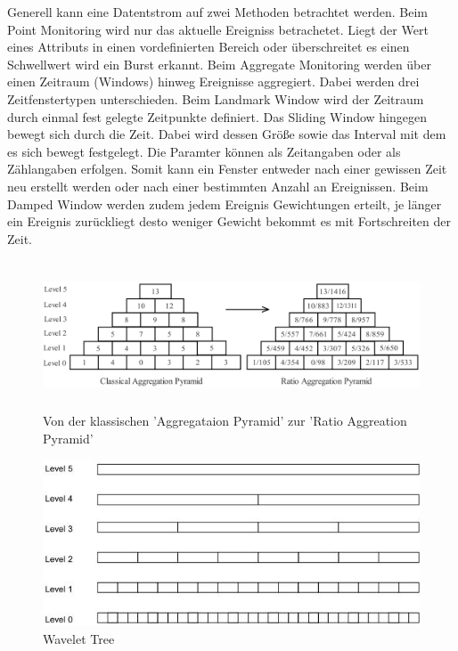 Generell kann eine Datentstrom auf zwei Methoden betrachtet werden. Beim Point Monitoring wird nur das aktuelle Ereigniss betrachetet. Liegt der Wert eines Attributs in einen vordefinierten Bereich oder überschreitet es einen Schwellwert wird ein Burst erkannt. Beim Aggregate Monitoring werden über einen Zeitraum (Windows) hinweg Ereignisse aggregiert. Dabei werden drei Zeitfenstertypen unterschieden. Beim Landmark Window wird der Zeitraum durch einmal fest gelegte Zeitpunkte definiert.
Das Sliding Window hingegen bewegt sich durch die Zeit. Dabei wird dessen Größe sowie das Interval mit dem es sich bewegt festgelegt. Die Paramter können als Zeitangaben oder als Zählangaben erfolgen. Somit kann ein Fenster entweder nach einer gewissen Zeit neu erstellt werden oder nach einer bestimmten Anzahl an Ereignissen. Beim Damped Window werden zudem jedem Ereignis Gewichtungen erteilt, je länger ein Ereignis zurückliegt desto weniger Gewicht bekommt es mit Fortschreiten der Zeit. \cite{Zhu:2003:EEB:956750.956789}\\

\begin{figure}[htbp]
\centerline{\includegraphics[height=4.4cm]{images/ratiopyramid.png}}
\caption{Von der klassischen 'Aggregataion Pyramid' zur 'Ratio Aggreation Pyramid' \cite{yuan2007online}}
\label{fig:ratiopyramid}
\end{figure}


\begin{figure}[h]
    \includegraphics[width=.5\textwidth]{images/wavelet.jpg}
    \caption{Wavelet Tree \cite{Zhu:2003:EEB:956750.956789}}
    \label{fig:wavelet}
\end{figure}

